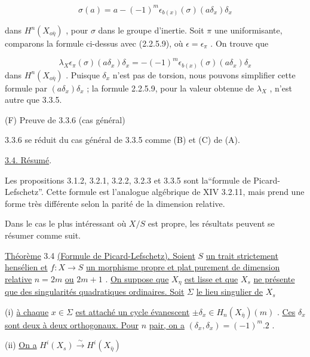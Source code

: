 \begin{equation*}
\sigma(a) = a - (-1)^m \epsilon_{b(x)}(\sigma)(a\delta_x)\delta_x 
\end{equation*}


 dans $H^n(X_{o\bar{\eta}})$ , pour $\sigma$ dans le groupe d'inertie. Soit $\pi$ une uniformisante, comparons la formule ci-dessus avec (2.2.5.9), où $\epsilon = \epsilon_{\pi}$ . On trouve que

\begin{equation*}
\lambda_X \epsilon_{\pi}(\sigma)(a\delta_x)\delta_x = - (-1)^m \epsilon_{b(x)}(\sigma)(a\delta_x)\delta_x
\end{equation*}
dans $H^n(X_{o\bar{\eta}})$ . Puisque $\delta_x$ n'est pas de torsion, nous pouvons simplifier cette formule par $(a\delta_x)\delta_x$ ; la formule 2.2.5.9, pour la valeur obtenue de $\lambda_X$ , n'est autre que 3.3.5.

(F) Preuve de 3.3.6 (cas général)

3.3.6 se réduit du cas général de 3.3.5 comme (B) et (C) de (A).


\underline{3.4. \quad Résumé}.

Les propositions 3.1.2, 3.2.1, 3.2.2, 3.2.3 et 3.3.5 sont la``formule de Picard-Lefschetz''. Cette formule est l'analogue algébrique de XIV 3.2.11, mais prend une forme très différente selon la parité de la dimension relative.

Dans le cas le plus intéressant où $X/S$ est propre, les résultats peuvent se résumer comme suit.

\underline{Théorème} 3.4 \underline{(Formule de Picard-Lefschetz). Soient} $S$ \underline{un trait strictement hensélien et} $f : X \to S$ \underline{un morphisme propre et plat purement de dimension relative} $n = 2m$ \underline{ou} $2m + 1$ . \underline{On suppose que} $X_{\eta}$ \underline{est lisse et que} $X_s$ \underline{ne présente que des singularités quadratiques ordinaires. Soit} $\Sigma$ \underline{le lieu singulier de} $X_s$

(i) \underline{à chaque} $x \in \Sigma$ \underline{est attaché un cycle évanescent} $\pm \delta_x \in H_n(X_{\bar{\eta}})(m)$ . \underline{Ces} $\delta_x$ \underline{sont deux à deux orthogonaux. Pour} $n$ \underline{pair, on a} $(\delta_x,\delta_x) = (-1)^m.2$ .

(ii) \underline{On a} \qquad $H^i(X_s) \xrightarrow{\ \sim\ } H^i(X_{\bar{\eta}})$

